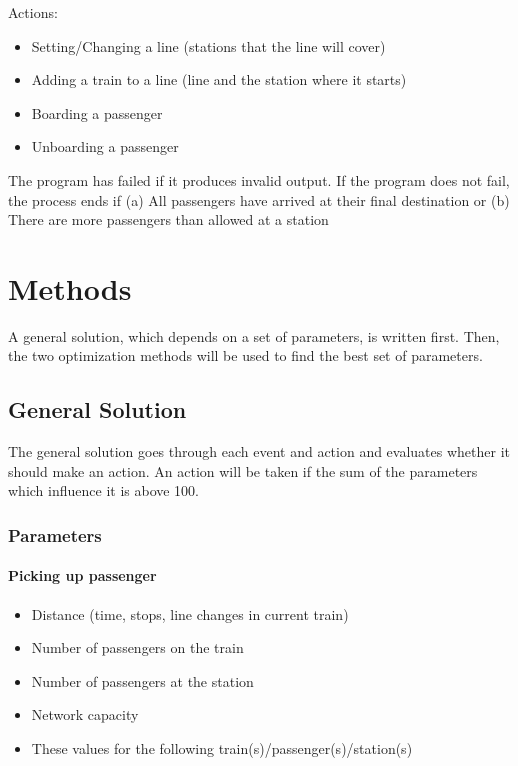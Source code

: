 \documentclass[10pt]{report}
\begin{document}
Actions:
\begin{itemize}
    \item Setting/Changing a line (stations that the line will cover)
    \item Adding a train to a line (line and the station where it starts)
    \item Boarding a passenger
    \item Unboarding a passenger
\end{itemize}

The program has failed if it produces invalid output. If the program does not fail, the process ends if
(a)	All passengers have arrived at their final destination
or
(b)	There are more passengers than allowed at a station


\chapter{Methods}

A general solution, which depends on a set of parameters, is written first. Then, the two optimization methods will be used to find the best set of parameters.


\section{General Solution}
The general solution goes through each event and action and evaluates whether it should make an action. An action will be taken if the sum of the parameters which influence it is above 100.

\subsection{Parameters}

\subsubsection{Picking up passenger}
\begin{itemize}
    \item Distance (time, stops, line changes in current train)
    \item Number of passengers on the train
    \item Number of passengers at the station
    \item Network capacity
    \item These values for the following train(s)/passenger(s)/station(s)
\end{itemize}
\end{document}
